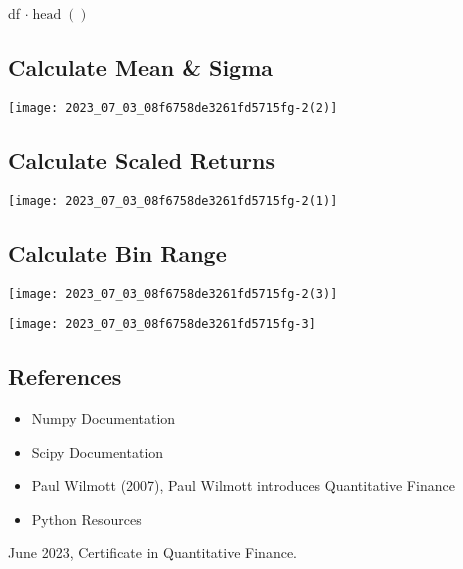 \documentclass[10pt]{article}
\begin{document}
df $\cdot \operatorname{head}()$

\subsection*{Calculate Mean \& Sigma}
\begin{center}
\texttt{[image: 2023\_07\_03\_08f6758de3261fd5715fg-2(2)]}
\end{center}

\subsection*{Calculate Scaled Returns}
\begin{center}
\texttt{[image: 2023\_07\_03\_08f6758de3261fd5715fg-2(1)]}
\end{center}

\subsection*{Calculate Bin Range}
\begin{center}
\texttt{[image: 2023\_07\_03\_08f6758de3261fd5715fg-2(3)]}
\end{center}

\begin{center}
\texttt{[image: 2023\_07\_03\_08f6758de3261fd5715fg-3]}
\end{center}

\subsection*{References}
\begin{itemize}
  \item Numpy Documentation

  \item Scipy Documentation

  \item Paul Wilmott (2007), Paul Wilmott introduces Quantitative Finance

  \item Python Resources

\end{itemize}

June 2023, Certificate in Quantitative Finance.
\end{document}
